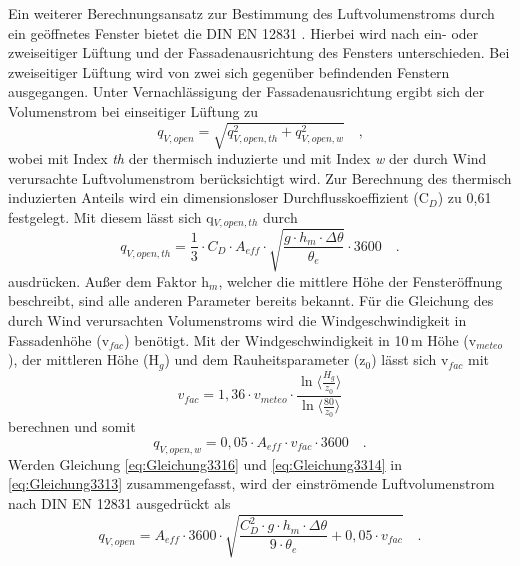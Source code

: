 Ein weiterer Berechnungsansatz zur Bestimmung des Luftvolumenstroms durch ein geöffnetes Fenster bietet die DIN EN 12831 \cite{DINDeutschesInstitutfurNormunge.V..September2017}.
Hierbei wird nach ein- oder zweiseitiger Lüftung und der Fassadenausrichtung des Fensters unterschieden.
Bei zweiseitiger Lüftung wird von zwei sich gegenüber befindenden Fenstern ausgegangen.
Unter Vernachlässigung der Fassadenausrichtung ergibt sich der Volumenstrom bei einseitiger Lüftung zu
\begin{equation}
\label{eq:Gleichung3313}
q_{V,open} = \sqrt{q_{V,open,th}^2 + q_{V,open,w}^2}\quad\text{,}
\end{equation}
wobei mit Index \textit{th} der thermisch induzierte und mit Index \textit{w} der durch Wind verursachte Luftvolumenstrom berücksichtigt wird.
Zur Berechnung des thermisch induzierten Anteils wird ein dimensionsloser Durchflusskoeffizient (C\(_D\)) zu 0,61 festgelegt.
Mit diesem lässt sich q\(_{V,open,th}\) durch
\begin{equation}
\label{eq:Gleichung3314}
q_{V,open,th} = \frac{1}{3} \cdot C_D \cdot A_{eff} \cdot \sqrt{\frac{g \cdot h_m \cdot \Delta \theta}{\theta_e}} \cdot 3600 \quad\text{.}
\end{equation}
ausdrücken.
Außer dem Faktor h\(_m\), welcher die mittlere Höhe der Fensteröffnung beschreibt, sind alle anderen Parameter bereits bekannt.
Für die Gleichung des durch Wind verursachten Volumenstroms wird die Windgeschwindigkeit in Fassadenhöhe (v\(_{fac}\)) benötigt.
Mit der Windgeschwindigkeit in 10\,m Höhe (v\(_{meteo}\)), der mittleren Höhe (H\(_g\)) und dem Rauheitsparameter (z\(_0\)) lässt sich v\(_{fac}\) mit
\begin{equation}
\label{eq:Gleichung3315}
v_{fac} = 1,36 \cdot v_{meteo} \cdot \frac{\ln{\biggl\langle\frac{H_g}{z_0}\biggr\rangle}}{\ln{\biggl\langle\frac{80}{z_0}\biggr\rangle}}
\end{equation}
berechnen und somit 
\begin{equation}
\label{eq:Gleichung3316}
q_{V,open,w} = 0,05 \cdot A_{eff} \cdot v_{fac} \cdot 3600 \quad \text{.}
\end{equation}
Werden Gleichung \ref{eq:Gleichung3316} und \ref{eq:Gleichung3314} in \ref{eq:Gleichung3313} zusammengefasst, wird der einströmende Luftvolumenstrom nach DIN EN 12831 ausgedrückt als
\begin{equation}
\label{eq:Gleichung3317}
q_{V,open} = A_{eff} \cdot 3600 \cdot \sqrt{\frac{C_{D}^2 \cdot g \cdot h_m \cdot \Delta \theta}{9 \cdot \theta_e} + 0,05 \cdot v_{fac}} \quad \text{.}
\end{equation}

